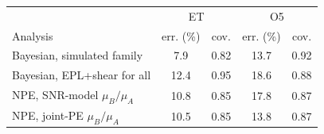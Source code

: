 \begin{tabular*}{\linewidth}{@{\extracolsep{\fill}}lcccc@{}}
\toprule
 & \multicolumn{2}{c}{ET} & \multicolumn{2}{c}{O5} \\
Analysis & err. (\%) & cov. & err. (\%) & cov. \\
\midrule
Bayesian, simulated family & 7.9 & 0.82 & 13.7 & 0.92 \\
Bayesian, EPL+shear for all & 12.4 & 0.95 & 18.6 & 0.88 \\
NPE, SNR-model $\mu_B/\mu_A$ & 10.8 & 0.85 & 17.8 & 0.87 \\
NPE, joint-PE $\mu_B/\mu_A$ & 10.5 & 0.85 & 13.8 & 0.87 \\
\bottomrule
\end{tabular*}